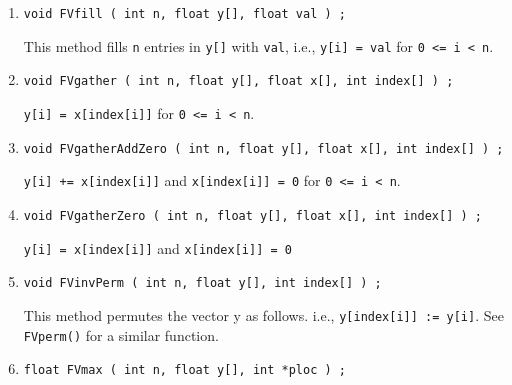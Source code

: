 \begin{enumerate}
\begin{verbatim}
float FVdot ( int n, float y[], float x[] ) ;
\end{verbatim}
This method returns the dot product of the vector {\tt x[]} and
{\tt y[]},
i.e., return
$\sum_{\tt i = 0}^{\tt n-1} ({\tt x[i]*y[i]})$.
\item
\begin{verbatim}
void FVfill ( int n, float y[], float val ) ;
\end{verbatim}
This method fills {\tt n} entries in {\tt y[]} with {\tt val}, 
i.e.,
{\tt y[i] = val} for {\tt 0 <= i < n}.
\item
\begin{verbatim}
void FVgather ( int n, float y[], float x[], int index[] ) ;
\end{verbatim}
{\tt y[i] = x[index[i]]} for {\tt 0 <= i < n}.
\item
\begin{verbatim}
void FVgatherAddZero ( int n, float y[], float x[], int index[] ) ;
\end{verbatim}
{\tt y[i] += x[index[i]]} and
{\tt x[index[i]] = 0} 
for {\tt 0 <= i < n}.
\item
\begin{verbatim}
void FVgatherZero ( int n, float y[], float x[], int index[] ) ;
\end{verbatim}
{\tt y[i] = x[index[i]]} and
{\tt x[index[i]] = 0} 
\item
\begin{verbatim}
void FVinvPerm ( int n, float y[], int index[] ) ;
\end{verbatim}
This method permutes the vector y as follows.
i.e.,
{\tt y[index[i]] := y[i]}.
See {\tt FVperm()} for a similar function.
\item
\begin{verbatim}
float FVmax ( int n, float y[], int *ploc ) ;
\end{verbatim}

\end{enumerate}
